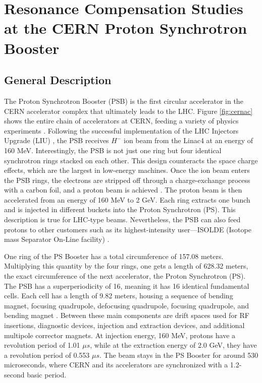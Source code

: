 \chapter{Resonance Compensation Studies at the CERN Proton Synchrotron Booster}
\label{sec:ch5}

\section{General Description}
The Proton Synchrotron Booster (PSB) is the first circular accelerator in the CERN accelerator complex that ultimately leads to the LHC. Figure \ref{fig:cernac} shows the entire chain of accelerators at CERN, feeding a variety of physics experiments \cite{cernplot}. Following the successful implementation of the LHC Injectors Upgrade (LIU) \cite{liu}, the PSB receives $H^-$ ion beam from the Linac4 at an energy of 160 MeV. Interestingly, the PSB is not just one ring but four identical synchrotron rings stacked on each other. This design counteracts the space charge effects, which are the largest in low-energy machines. Once the ion beam enters the PSB rings, the electrons are stripped off through a charge-exchange process with a carbon foil, and a proton beam is achieved \cite{psbstrip}. The proton beam is then accelerated from an energy of 160 MeV to 2 GeV. Each ring extracts one bunch and is injected in different buckets into the Proton Synchrotron (PS). This description is true for LHC-type beams. Nevertheless, the PSB can also feed protons to other customers such as its highest-intensity user---ISOLDE (Isotope mass Separator On-Line facility) \cite{foteini1}.   

One ring of the PS Booster has a total circumference of 157.08 meters. Multiplying this quantity by the four rings, one gets a length of 628.32 meters, the exact circumference of the next accelerator, the Proton Synchrotron (PS). The PSB has a superperiodicity of 16, meaning it has 16 identical fundamental cells. Each cell has a length of 9.82 meters, housing a sequence of bending magnet, focusing quadrupole, defocusing quadrupole, focusing quadrupole, and bending magnet \cite{tirsithesis,foteinithesis}. Between these main components are drift spaces used for RF insertions, diagnostic devices, injection and extraction devices, and additional multipole corrector magnets. At injection energy, 160 MeV, protons have a revolution period of 1.01 $\mu s$, while at the extraction energy of 2.0 GeV, they have a revolution period of 0.553 $\mu s$. The beam stays in the PS Booster for around 530 microseconds, where CERN and its accelerators are synchronized with a 1.2-second basic period. 

